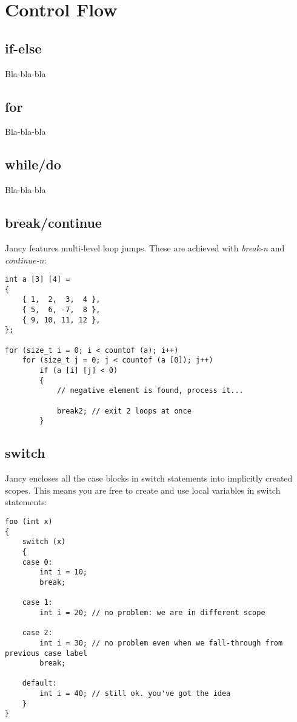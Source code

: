 \documentclass[oneside]{book}
\begin{document}
\section{Control Flow}
\subsection{if-else}

Bla-bla-bla

\subsection{for}

Bla-bla-bla

\subsection{while/do}

Bla-bla-bla

\subsection{break/continue}

Jancy features multi-level loop jumps. These are achieved with \emph{break-n} and \emph{continue-n}:

\begin{lstlisting}
int a [3] [4] = 
{
    { 1,  2,  3,  4 },
    { 5,  6, -7,  8 },
    { 9, 10, 11, 12 },
};

for (size_t i = 0; i < countof (a); i++)
    for (size_t j = 0; j < countof (a [0]); j++)
        if (a [i] [j] < 0)
        {
            // negative element is found, process it...

            break2; // exit 2 loops at once
        }
\end{lstlisting}

\subsection{switch}

Jancy encloses all the case blocks in switch statements into implicitly created scopes. This means you are free to create and use local variables in switch statements:

\begin{lstlisting}
foo (int x)
{
    switch (x)
    {
    case 0:
        int i = 10;
        break;

    case 1:
        int i = 20; // no problem: we are in different scope
    
    case 2:
        int i = 30; // no problem even when we fall-through from previous case label
        break;

    default:
        int i = 40; // still ok. you've got the idea
    }
}
\end{lstlisting}
\end{document}
